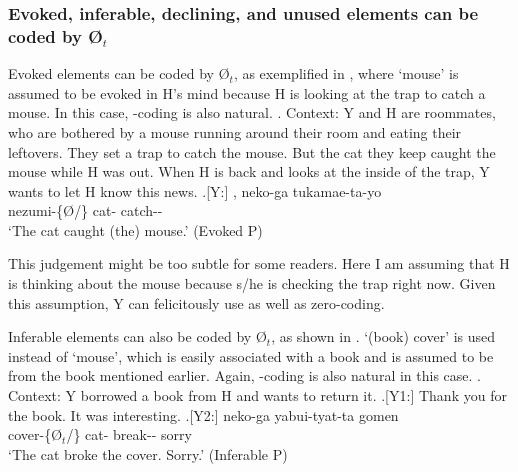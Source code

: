 \subsubsection{Evoked, inferable, declining, and unused elements can be coded by {\O$_{t}$}}

Evoked elements can be coded by {\O$_{t}$},
as exemplified in \Next,
where `mouse' is assumed to be evoked in H's mind
because H is looking at the trap to catch a mouse.
In this case, -coding is also natural.
%
\ex. Context: Y and H are roommates,
	who are bothered by a mouse running around their room
	and eating their leftovers.
	They set a trap to catch the mouse.
	But the cat they keep caught the mouse while H was out.
	When H is back and looks at the inside of the trap,
	Y wants to let H know this news.
	\ag.[Y:] , neko-ga tukamae-ta-yo \\
		nezumi-\{{\O}/\} cat- catch-- \\
		`The cat caught (the) mouse.' \hfill{(Evoked  P)}

This judgement might be too subtle for some readers.
Here I am assuming that H is thinking about the mouse because s/he is checking the trap right now.
Given this assumption, Y can felicitously use  as well as zero-coding.

Inferable elements can also be coded by {\O$_{t}$},
as shown in \Next.
 `(book) cover' is used instead of  `mouse',
which is easily associated with a book and is assumed to be  from the book mentioned earlier.
Again, -coding is also natural in this case.
%
\ex. Context: Y borrowed a book from H and wants to return it.
 \a.[Y1:] Thank you for the book. It was interesting.
 \bg.[Y2:]  neko-ga yabui-tyat-ta gomen \\
   cover-\{{\O$_{t}$}/\} cat- break-- sorry \\
   `The cat broke the cover. Sorry.' \hfill{(Inferable  P)}


